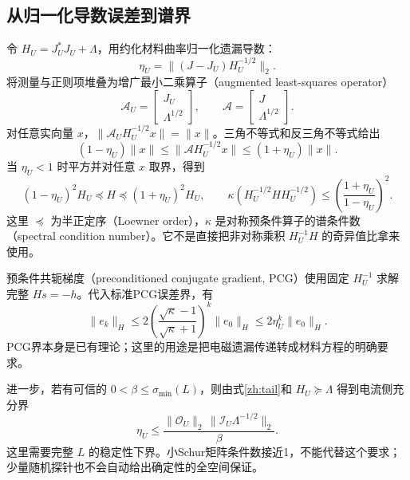\subsection{从归一化导数误差到谱界}
令 $H_U=J_U^*J_U+\Lambda$，用约化材料曲率归一化遗漏导数：
\begin{equation}
 \eta_U=\|(J-J_U)H_U^{-1/2}\|_2.
\end{equation}
将测量与正则项堆叠为增广最小二乘算子（augmented least-squares operator）
\begin{equation}
 \mathcal A_U=\begin{bmatrix}J_U\\\Lambda^{1/2}\end{bmatrix},\qquad
 \mathcal A=\begin{bmatrix}J\\\Lambda^{1/2}\end{bmatrix}.
\end{equation}
对任意实向量 $x$，$\|\mathcal A_UH_U^{-1/2}x\|=\|x\|$。三角不等式和反三角不等式给出
\begin{equation}
 (1-\eta_U)\|x\|\le\|\mathcal AH_U^{-1/2}x\|
 \le(1+\eta_U)\|x\|.
\end{equation}
当 $\eta_U<1$ 时平方并对任意 $x$ 取界，得到
\begin{equation}
 (1-\eta_U)^2H_U\preceq H\preceq(1+\eta_U)^2H_U,
 \qquad
 \kappa(H_U^{-1/2}HH_U^{-1/2})
 \le\left(\frac{1+\eta_U}{1-\eta_U}\right)^2.
\end{equation}
这里 $\preceq$ 为半正定序（Loewner order），$\kappa$ 是对称预条件算子的谱条件数（spectral condition number）。它不是直接把非对称乘积 $H_U^{-1}H$ 的奇异值比拿来使用。

预条件共轭梯度（preconditioned conjugate gradient, PCG）使用固定 $H_U^{-1}$ 求解完整 $Hs=-h$。代入标准PCG误差界，有
\begin{equation}
 \|e_k\|_H\le2\left(\frac{\sqrt\kappa-1}{\sqrt\kappa+1}\right)^k\|e_0\|_H
 \le2\eta_U^k\|e_0\|_H.
\end{equation}
PCG界本身是已有理论；这里的用途是把电磁遗漏传递转成材料方程的明确要求。

进一步，若有可信的 $0<\beta\le\sigma_{\min}(L)$，则由式\eqref{zh:tail}和 $H_U\succeq\Lambda$ 得到电流侧充分界
\begin{equation}
 \eta_U\le\frac{\|\mathcal O_U\|_2\,
 \|\mathcal I_U\Lambda^{-1/2}\|_2}{\beta}.
\end{equation}
这里需要完整 $L$ 的稳定性下界。小Schur矩阵条件数接近1，不能代替这个要求；少量随机探针也不会自动给出确定性的全空间保证。


